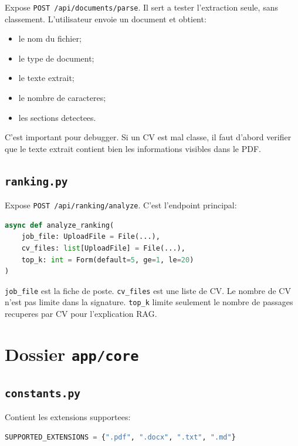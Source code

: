 \documentclass[12pt,a4paper]{article}
\begin{document}
Expose \texttt{POST /api/documents/parse}. Il sert a tester l'extraction seule, sans classement. L'utilisateur envoie un document et obtient:

\begin{itemize}
  \item le nom du fichier;
  \item le type de document;
  \item le texte extrait;
  \item le nombre de caracteres;
  \item les sections detectees.
\end{itemize}

C'est important pour debugger. Si un CV est mal classe, il faut d'abord verifier que le texte extrait contient bien les informations visibles dans le PDF.

\subsection{\texttt{ranking.py}}

Expose \texttt{POST /api/ranking/analyze}. C'est l'endpoint principal:

\begin{lstlisting}[style=smartcode,language=Python]
async def analyze_ranking(
    job_file: UploadFile = File(...),
    cv_files: list[UploadFile] = File(...),
    top_k: int = Form(default=5, ge=1, le=20)
)
\end{lstlisting}

\texttt{job\_file} est la fiche de poste. \texttt{cv\_files} est une liste de CV. Le nombre de CV n'est pas limite dans la signature. \texttt{top\_k} limite seulement le nombre de passages recuperes par CV pour l'explication RAG.

\section{Dossier \texttt{app/core}}

\subsection{\texttt{constants.py}}

Contient les extensions supportees:

\begin{lstlisting}[style=smartcode,language=Python]
SUPPORTED_EXTENSIONS = {".pdf", ".docx", ".txt", ".md"}
\end{lstlisting}
\end{document}
